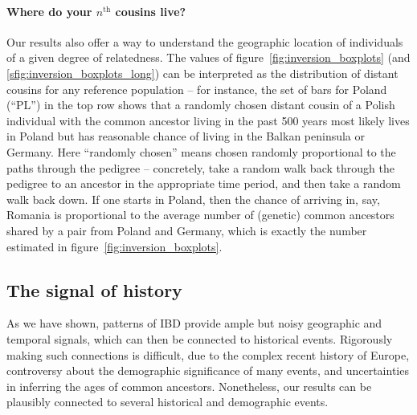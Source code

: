 \documentclass{article}
\begin{document}
\paragraph{Where do your $n^\mathrm{th}$ cousins live?}
Our results also offer a way to understand the geographic location
of individuals of a given degree of relatedness. 
The values of figure~\ref{fig:inversion_boxplots} (and \ref{sfig:inversion_boxplots_long}) 
can be interpreted as the distribution of distant cousins for any reference population --
for instance, the set of bars for Poland (``PL'') in the top row shows
that a randomly chosen distant cousin of a Polish individual with the common ancestor
living in the past 500 years most likely lives in Poland  
but has reasonable chance of living in the Balkan peninsula or Germany.
Here ``randomly chosen'' means chosen randomly proportional to the paths through the pedigree --
concretely, take a random walk back through the pedigree to an ancestor in the appropriate time period,
and then take a random walk back down.
If one starts in Poland, then the chance of arriving in, say, Romania 
is proportional to the average number of (genetic) common ancestors shared by a pair from Poland and Germany,
which is exactly the number estimated in figure~\ref{fig:inversion_boxplots}.


\subsection*{The signal of history}
\label{ss:signalofhistory}

As we have shown, patterns of IBD provide ample but noisy geographic and temporal signals,
which can then be connected to historical events.
Rigorously making such connections is difficult, 
due to the complex recent history of Europe,
controversy about the demographic significance of many events,
and uncertainties in inferring the ages of common ancestors.
Nonetheless, our results can be plausibly connected to 
several historical and demographic events.
\end{document}
